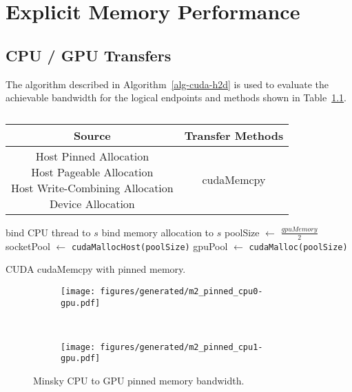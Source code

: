 \chapter{Explicit Memory Performance}
\label{ch:explicit}

\section{CPU / GPU Transfers}

The algorithm described in Algorithm~\ref{alg-cuda-h2d} is used to evaluate the achievable bandwidth for the logical endpoints and methods shown in Table~\ref{tab:explicit-transfer}.

\begin{table}[ht]
    \centering
    \caption[]{}
    \label{tab:explicit-transfer}
    \begin{tabular}{|c|c|}
    \hline
    \textbf{Source} & \textbf{Transfer Methods} \\ \hline 
    \makecell{Host Pinned Allocation \\ Host Pageable Allocation \\ Host Write-Combining Allocation \\ Device Allocation} & cudaMemcpy \\ \hline
    \end{tabular}
\end{table}

\begin{algorithm}[ht]
    \SetAlgoLined
    bind CPU thread to $s$\;
    bind memory allocation to $s$\;
    poolSize $\gets$ $\frac{gpuMemory}{2}$\;
    socketPool $\gets$ \texttt{cudaMallocHost(poolSize)}\;
    gpuPool $\gets$ \texttt{cudaMalloc(poolSize)}\;
    \caption{CUDA cudaMemcpy with pinned memory.}
    \label{alg:cuda-h2d}
\end{algorithm}

\begin{figure}[ht]
    \centering
    \begin{subfigure}[b]{0.45\textwidth}
        \texttt{[image: figures/generated/m2\_pinned\_cpu0-gpu.pdf]}
        \caption{}
        \label{fig:minsky-topo-hardware}
    \end{subfigure}
    ~
    \begin{subfigure}[b]{0.45\textwidth}
        \texttt{[image: figures/generated/m2\_pinned\_cpu1-gpu.pdf]}
        \caption{}
        \label{fig:minsky-topo-cuda-simple}
    \end{subfigure}
    \caption[]{Minsky CPU to GPU pinned memory bandwidth.}
    \label{fig:minsky-pinned-cpu}
\end{figure}

